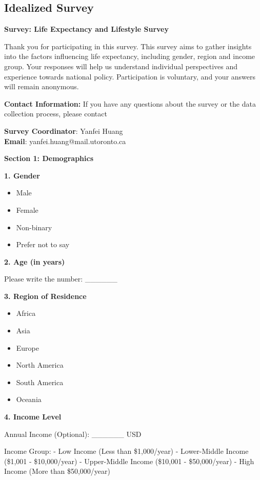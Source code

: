 \documentclass[
  letterpaper,
  DIV=11,
  numbers=noendperiod]{scrartcl}
\providecommand{\tightlist}{%
  \setlength{\itemsep}{0pt}\setlength{\parskip}{0pt}}\usepackage{longtable,booktabs,array}
\begin{document}
\subsection{Idealized Survey}\label{idealized-survey}

\textbf{Survey: Life Expectancy and Lifestyle Survey}

Thank you for participating in this survey. This survey aims to gather
insights into the factors influencing life expectancy, including gender,
region and income group. Your responses will help us understand
individual perspectives and experience towards national policy.
Participation is voluntary, and your answers will remain anonymous.

\textbf{Contact Information:} If you have any questions about the survey
or the data collection process, please contact

\textbf{Survey Coordinator}: Yanfei Huang\\
\textbf{Email}: yanfei.huang@mail.utoronto.ca

\textbf{Section 1: Demographics}

\textbf{1. Gender}

\begin{itemize}
\tightlist
\item
  Male
\item
  Female
\item
  Non-binary
\item
  Prefer not to say
\end{itemize}

\textbf{2. Age (in years)}

Please write the number: \_\_\_\_\_\_

\textbf{3. Region of Residence}

\begin{itemize}
\tightlist
\item
  Africa
\item
  Asia
\item
  Europe
\item
  North America
\item
  South America
\item
  Oceania
\end{itemize}

\textbf{4. Income Level}

Annual Income (Optional): \_\_\_\_\_\_ USD

Income Group: - Low Income (Less than \$1,000/year) - Lower-Middle
Income (\$1,001 - \$10,000/year) - Upper-Middle Income (\$10,001 -
\$50,000/year) - High Income (More than \$50,000/year)
\end{document}
